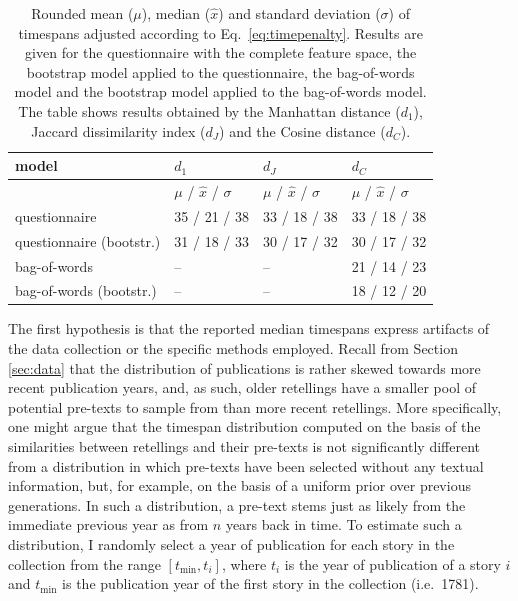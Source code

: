 \begin{table}
\centering
\begin{tabular}{llll}
\toprule
model                     & $d_1$                  & $d_J$                 & $d_C$                 \\ \midrule
                          & $\mu$ / $\hat{x}$  / $\sigma$  & $\mu$ / $\hat{x}$  / $\sigma$ & $\mu$ / $\hat{x}$ / $\sigma$ \\ \cmidrule(r){2-4}
questionnaire             & 35    / 21 / 38        & 33    / 18 / 38       & 33    / 18 / 38       \\
questionnaire (bootstr.) & 31    / 18 / 33        & 30    / 17 / 32       & 30    / 17 / 32       \\
bag-of-words              & --                     & --                    & 21    / 14 / 23       \\
bag-of-words (bootstr.)  & --                     & --                    & 18    / 12 / 20       \\
\bottomrule
\end{tabular}
\caption{Rounded mean ($\mu$), median ($\hat{x}$) and standard deviation ($\sigma$) of timespans adjusted according to Eq.\ \ref{eq:timepenalty}. Results are given for the questionnaire with the complete feature space, the bootstrap model applied to the questionnaire, the bag-of-words model and the bootstrap model applied to the bag-of-words model. The table shows results obtained by the Manhattan distance ($d_1$), Jaccard dissimilarity index ($d_J$) and the Cosine distance ($d_C$).}
\label{tab:result-statistics}
\end{table}

The first hypothesis is that the reported median timespans express artifacts of the data collection or the specific methods employed. Recall from Section \ref{sec:data} that the distribution of publications is rather skewed towards more recent publication years, and, as such, older retellings have a smaller pool of potential pre-texts to sample from than more recent retellings. More specifically, one might argue that the timespan distribution computed on the basis of the similarities between retellings and their pre-texts is not significantly different from a distribution in which pre-texts have been selected without any textual information, but, for example, on the basis of a uniform prior over previous generations. In such a distribution, a pre-text stems just as likely from the immediate previous year as from $n$ years back in time. To estimate such a distribution, I randomly select a year of publication for each story in the collection from the range $[t_{\min}, t_i]$, where $t_i$ is the year of publication of a story $i$ and $t_{\min}$ is the publication year of the first story in the collection (i.e.\ 1781). 

